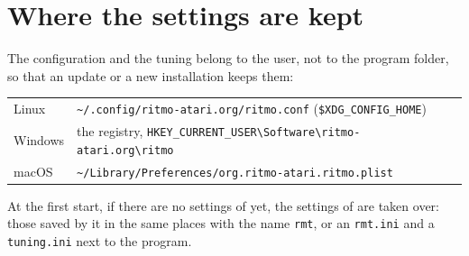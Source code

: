 \section{Where the settings are kept}

The configuration and the tuning belong to the user, not to the program folder, so that an update
or a new installation keeps them:

\begin{center}
\begin{tabular}{@{}ll@{}}
\toprule
Linux & \texttt{\textasciitilde/.config/ritmo-atari.org/ritmo.conf} (\texttt{\$XDG\_CONFIG\_HOME}) \\
Windows & the registry, \texttt{HKEY\_CURRENT\_USER\textbackslash Software\textbackslash ritmo-atari.org\textbackslash ritmo} \\
macOS & \texttt{\textasciitilde/Library/Preferences/org.ritmo-atari.ritmo.plist} \\
\bottomrule
\end{tabular}
\end{center}

At the first start, if there are no settings of \RITMO{} yet, the settings of \RMT{} are taken over: those
saved by it in the same places with the name \texttt{rmt}, or an \texttt{rmt.ini} and a
\texttt{tuning.ini} next to the program.
